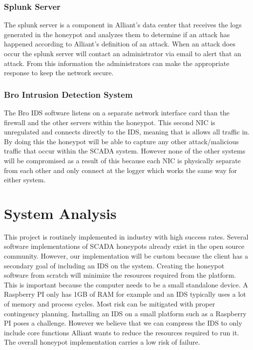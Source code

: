 \subsubsection{Splunk Server}
The splunk server is a component in Alliant's data center that receives the logs generated in the honeypot and analyzes them to determine if an attack has happened according to Alliant's definition of an attack.  When an attack does occur the splunk server will contact an administrator via email to alert that an attack.  From this information the administrators can make  the appropriate response to keep the network secure.

\subsubsection{Bro Intrusion Detection System}
The Bro IDS software listens on a separate network interface card than the firewall and the other servers within the honeypot.  This second NIC is unregulated and connects directly to the IDS, meaning that is allows all traffic in.  By doing this the honeypot will be able to capture any other attack/malicious traffic that occur within the SCADA system.  However none of the other systems will be compromised as a result of this because each NIC is physically separate from each other and only connect at the logger which works the same way for either system.  

\section{System Analysis}
This project is routinely implemented in industry with high success rates. Several software implementations of SCADA honeypots already exist in the open source community. However, our implementation will be custom because the client has a secondary goal of including an IDS on the system. Creating the honeypot software from scratch will minimize the resources required from the platform. This is important because the computer needs to be a small standalone device. A Raspberry PI only has 1GB of RAM for example and an IDS typically uses a lot of memory and process cycles. Most risk can be mitigated with proper contingency planning. Installing an IDS on a small platform such as a Raspberry PI poses a challenge.  However we believe that we can compress the IDS to only include core functions Alliant wants to reduce the  resources required to run it.  The overall honeypot implementation carries a low risk of failure.

